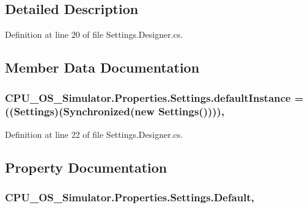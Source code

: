 \subsection{Detailed Description}


Definition at line 20 of file Settings.\+Designer.\+cs.



\subsection{Member Data Documentation}
\hypertarget{class_c_p_u___o_s___simulator_1_1_properties_1_1_settings_a9016562ea46f792bf8dc8d3e79dd36ae}{}
\subsubsection[{default\+Instance}]{ C\+P\+U\+\_\+\+O\+S\+\_\+\+Simulator.\+Properties.\+Settings.\+default\+Instance = (({\bf Settings})(Synchronized(new {\bf Settings}())))\hspace{0.3cm}{\ttfamily [static]}, {\ttfamily [private]}}\label{class_c_p_u___o_s___simulator_1_1_properties_1_1_settings_a9016562ea46f792bf8dc8d3e79dd36ae}


Definition at line 22 of file Settings.\+Designer.\+cs.



\subsection{Property Documentation}
\hypertarget{class_c_p_u___o_s___simulator_1_1_properties_1_1_settings_a423993327c18a4dfede5f73981018fca}{}
\subsubsection[{Default}]{ C\+P\+U\+\_\+\+O\+S\+\_\+\+Simulator.\+Properties.\+Settings.\+Default\hspace{0.3cm}{\ttfamily [static]}, {\ttfamily [get]}}\label{class_c_p_u___o_s___simulator_1_1_properties_1_1_settings_a423993327c18a4dfede5f73981018fca}



